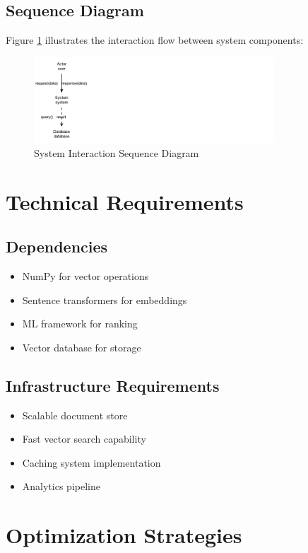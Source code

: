 \documentclass[12pt,a4paper]{article}
\begin{document}
\subsection{Sequence Diagram}
Figure \ref{fig:sequence_diagram} illustrates the interaction flow between system components:

\begin{figure}[h]
    \centering
    \includegraphics[width=0.8\textwidth]{simple_sequence}
    \caption{System Interaction Sequence Diagram}
    \label{fig:sequence_diagram}
\end{figure}

\section{Technical Requirements}
\subsection{Dependencies}
\begin{itemize}
    \item NumPy for vector operations
    \item Sentence transformers for embeddings
    \item ML framework for ranking
    \item Vector database for storage
\end{itemize}

\subsection{Infrastructure Requirements}
\begin{itemize}
    \item Scalable document store
    \item Fast vector search capability
    \item Caching system implementation
    \item Analytics pipeline
\end{itemize}

\section{Optimization Strategies}
\end{document}
